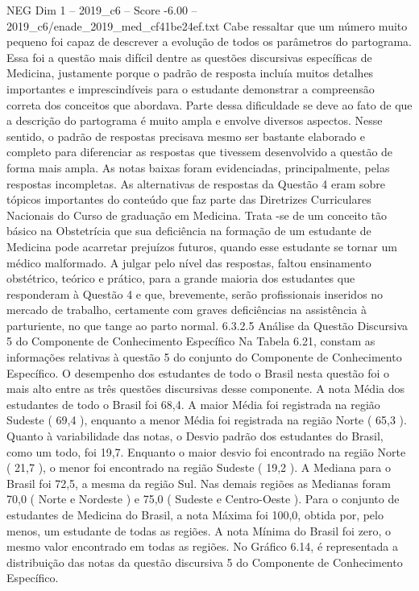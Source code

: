 \begin{textsample}{NEG Dim 1 – 2019\_c6 – Score -6.00 – 2019\_c6/enade\_2019\_med\_cf41be24ef.txt}
Cabe ressaltar que um número muito pequeno foi capaz de descrever a evolução de todos os parâmetros do partograma.
Essa foi a questão mais difícil dentre as questões discursivas específicas de Medicina, justamente porque o padrão de resposta incluía muitos detalhes importantes e imprescindíveis para o estudante demonstrar a compreensão correta dos conceitos que abordava.
Parte dessa dificuldade se deve ao fato de que a descrição do partograma é muito ampla e envolve diversos aspectos.
Nesse sentido, o padrão de respostas precisava mesmo ser bastante elaborado e completo para diferenciar as respostas que tivessem desenvolvido a questão de forma mais ampla.
As notas baixas foram evidenciadas, principalmente, pelas respostas incompletas.
As alternativas de respostas da Questão 4 eram sobre tópicos importantes do conteúdo que faz parte das Diretrizes Curriculares Nacionais do Curso de graduação em Medicina.
Trata -se de um conceito tão básico na Obstetrícia que sua deficiência na formação de um estudante de Medicina pode acarretar prejuízos futuros, quando esse estudante se tornar um médico malformado.
A julgar pelo nível das respostas, faltou ensinamento obstétrico, teórico e prático, para a grande maioria dos estudantes que responderam à Questão 4 e que, brevemente, serão profissionais inseridos no mercado de trabalho, certamente com graves deficiências na assistência à parturiente, no que tange ao parto normal. 6.3.2.5 Análise da Questão Discursiva 5 do Componente de Conhecimento Específico Na Tabela 6.21, constam as informações relativas à questão 5 do conjunto do Componente de Conhecimento Específico.
O desempenho dos estudantes de todo o Brasil nesta questão foi o mais alto entre as três questões discursivas desse componente.
A nota Média dos estudantes de todo o Brasil foi 68,4.
A maior Média foi registrada na região Sudeste ( 69,4 ), enquanto a menor Média foi registrada na região Norte ( 65,3 ).
Quanto à variabilidade das notas, o Desvio padrão dos estudantes do Brasil, como um todo, foi 19,7.
Enquanto o maior desvio foi encontrado na região Norte ( 21,7 ), o menor foi encontrado na região Sudeste ( 19,2 ).
A Mediana para o Brasil foi 72,5, a mesma da região Sul.
Nas demais regiões as Medianas foram 70,0 ( Norte e Nordeste ) e 75,0 ( Sudeste e Centro-Oeste ).
Para o conjunto de estudantes de Medicina do Brasil, a nota Máxima foi 100,0, obtida por, pelo menos, um estudante de todas as regiões.
A nota Mínima do Brasil foi zero, o mesmo valor encontrado em todas as regiões.
No Gráfico 6.14, é representada a distribuição das notas da questão discursiva 5 do Componente de Conhecimento Específico.

\end{textsample}

